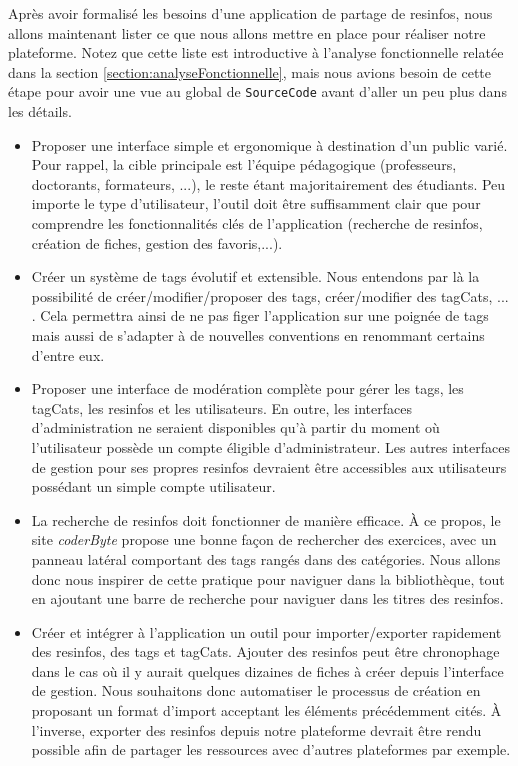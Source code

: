 Après avoir formalisé les besoins d'une application de partage de \glspl{resinfo}, nous allons maintenant lister ce que nous allons mettre en place pour réaliser notre plateforme. Notez que cette liste est introductive à l'analyse fonctionnelle relatée dans la section \ref{section:analyseFonctionnelle}, mais nous avions besoin de cette étape pour avoir une vue au global de \texttt{SourceCode} avant d'aller un peu plus dans les détails.

\begin{itemize}
    \item Proposer une interface simple et ergonomique à destination d'un public varié. Pour rappel, la cible principale est l'équipe pédagogique (professeurs, doctorants, formateurs, ...), le reste étant majoritairement des étudiants. Peu importe le type d'utilisateur, l'outil doit être suffisamment clair que pour comprendre les fonctionnalités clés de l'application (recherche de \glspl{resinfo}, création de \glspl{fiche}, gestion des favoris,...).
    \item Créer un système de \glspl{tag} évolutif et extensible. Nous entendons par là la possibilité de créer/modifier/proposer des \glspl{tag}, créer/modifier des \glspl{tagCat}, ... . Cela permettra ainsi de ne pas figer l'application sur une poignée de \glspl{tag} mais aussi de s'adapter à de nouvelles conventions en renommant certains d'entre eux.
    \item Proposer une interface de modération complète pour gérer les \glspl{tag}, les \glspl{tagCat}, les \glspl{resinfo} et les utilisateurs. En outre, les interfaces d'administration ne seraient disponibles qu'à partir du moment où l'utilisateur possède un compte éligible d'administrateur. Les autres interfaces de gestion pour ses propres \glspl{resinfo} devraient être accessibles aux utilisateurs possédant un simple compte utilisateur.
    \item La recherche de \glspl{resinfo} doit fonctionner de manière efficace. À ce propos, le site \textit{coderByte} propose une bonne façon de rechercher des exercices, avec un panneau latéral comportant des \glspl{tag} rangés dans des catégories. Nous allons donc nous inspirer de cette pratique pour naviguer dans la bibliothèque, tout en ajoutant une barre de recherche pour naviguer dans les titres des \glspl{resinfo}.
    \item Créer et intégrer à l'application un outil pour importer/exporter rapidement des \glspl{resinfo}, des \glspl{tag} et \glspl{tagCat}. Ajouter des \glspl{resinfo} peut être chronophage dans le cas où il y aurait quelques dizaines de \glspl{fiche} à créer depuis l'interface de gestion. Nous souhaitons donc automatiser le processus de création en proposant un format d'import acceptant les éléments précédemment cités. À l'inverse, exporter des \glspl{resinfo} depuis notre plateforme devrait être rendu possible afin de partager les ressources avec d'autres plateformes par exemple.

\end{itemize}
